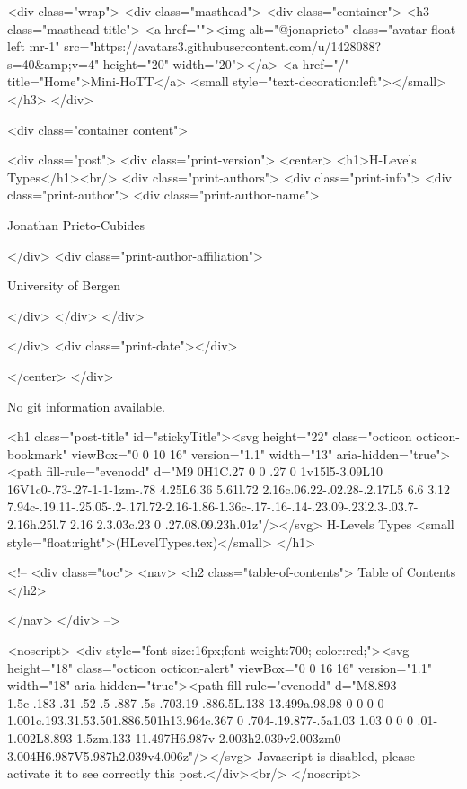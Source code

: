     <div class="wrap">
      <div class="masthead">
        <div class="container">
          <h3 class="masthead-title">
            <a href=""><img alt="@jonaprieto" class="avatar float-left mr-1" src="https://avatars3.githubusercontent.com/u/1428088?s=40&amp;v=4" height="20" width="20"></a>
            <a href="/" title="Home">Mini-HoTT</a>
            <small style="text-decoration:left"></small>
          </h3>
        </div>
      
      <div class="container content">
        







<div class="post">
  <div class="print-version">
    <center>
      <h1>H-Levels Types</h1><br/>
        <div class="print-authors">
          <div class="print-info">
            <div class="print-author">
              <div class="print-author-name">
                
                  Jonathan Prieto-Cubides
                
              </div>
              <div class="print-author-affiliation">
                
                  University of Bergen
                
                </div>
            </div>
          </div>
          
          
        </div>
        <div class="print-date"></div>
        
        
    </center>
  </div>

  
  No git information available.
  

  <h1 class="post-title" id="stickyTitle"><svg height="22" class="octicon octicon-bookmark" viewBox="0 0 10 16" version="1.1" width="13" aria-hidden="true"><path fill-rule="evenodd" d="M9 0H1C.27 0 0 .27 0 1v15l5-3.09L10 16V1c0-.73-.27-1-1-1zm-.78 4.25L6.36 5.61l.72 2.16c.06.22-.02.28-.2.17L5 6.6 3.12 7.94c-.19.11-.25.05-.2-.17l.72-2.16-1.86-1.36c-.17-.16-.14-.23.09-.23l2.3-.03.7-2.16h.25l.7 2.16 2.3.03c.23 0 .27.08.09.23h.01z"/></svg> H-Levels Types <small style="float:right">(HLevelTypes.tex)</small>
  </h1>

  <!-- 
  <div class="toc">
    <nav>
    <h2 class="table-of-contents"> Table of Contents </h2>
      

    </nav>
  </div>
   -->

  <noscript>
  <div style="font-size:16px;font-weight:700; color:red;"><svg height="18" class="octicon octicon-alert" viewBox="0 0 16 16" version="1.1" width="18" aria-hidden="true"><path fill-rule="evenodd" d="M8.893 1.5c-.183-.31-.52-.5-.887-.5s-.703.19-.886.5L.138 13.499a.98.98 0 0 0 0 1.001c.193.31.53.501.886.501h13.964c.367 0 .704-.19.877-.5a1.03 1.03 0 0 0 .01-1.002L8.893 1.5zm.133 11.497H6.987v-2.003h2.039v2.003zm0-3.004H6.987V5.987h2.039v4.006z"/></svg> Javascript is disabled, please activate it to see correctly this post.</div><br/>
  </noscript>

